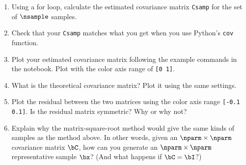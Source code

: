 \documentclass[11pt,titlepage,fleqn]{article}
\begin{document}
\begin{enumerate}
\item Using a for loop, calculate the estimated covariance matrix \verb+Csamp+ for the set of $\nsample$ samples.

\item Check that your \verb+Csamp+ matches what you get when you use Python's \verb+cov+ function.

\item Plot your estimated covariance matrix following the example commands in the notebook. Plot with the color axis range of \verb+[0 1]+.

\item What is the theoretical covariance matrix? Plot it using the same settings.

\vertgap

\item Plot the residual between the two matrices using the color axis range \verb+[-0.1 0.1]+.
Is the residual matrix symmetric? Why or why not?

\vertgap
\vertgap


\item Explain why the matrix-square-root method would give the same kinds of samples as the method above. In other words, given an $\nparm \times \nparm$ covariance matrix $\bC$, how can you generate an $\nparm \times \nparm$ representative sample $\bx$? (And what happens if $\bC = \bI$?)

\end{enumerate}

\end{document}
